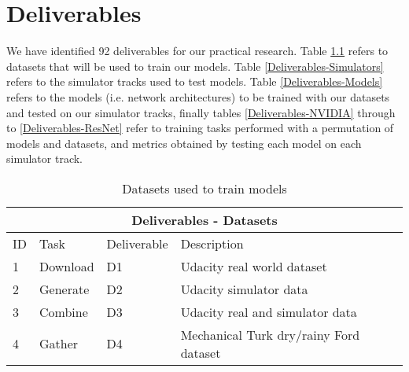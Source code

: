 \chapter{Deliverables} %

\label{AppendixC} %

We have identified 92 deliverables for our practical research. Table \ref{Deliverables-Datasets} refers to datasets that will be used to train our models. Table \ref{Deliverables-Simulators} refers to the simulator tracks used to test models. Table \ref{Deliverables-Models} refers to the models (i.e. network architectures) to be trained with our datasets and tested on our simulator tracks, finally tables \ref{Deliverables-NVIDIA} through to \ref{Deliverables-ResNet} refer to training tasks performed with a permutation of models and datasets, and metrics obtained by testing each model on each simulator track.


\begin{table}[]
\begin{center}
\begin{tabular}{|l|l|l|l|}
\hline
\multicolumn{4}{|c|}{Deliverables - Datasets} \\ \hline


ID & Task &  Deliverable & Description \\ \hline\hline
1 & Download & D1 &  Udacity real world dataset  \\ \hline
2 & Generate & D2 &  Udacity simulator data  \\ \hline
3 & Combine & D3 &  Udacity real and simulator data  \\ \hline
4 & Gather & D4 &  Mechanical Turk dry/rainy Ford dataset  \\ \hline

\end{tabular}
\end{center}
\caption{Datasets used to train models}
\label{Deliverables-Datasets}
\end{table}


